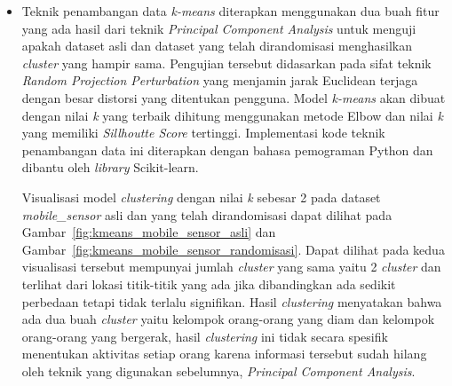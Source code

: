 \begin{itemize}
	\noindent\begin{minipage}{.44\textwidth}
	\begin{lstlisting}[caption=Sillhoutte Score Dataset Asli,frame=tlrb, label=mobile_sensor_siluet_asli]{Name}
Sillhoutte Score setiap K
pada dataset asli: 
2: 0.7568010158989575
3: 0.6390101777235029
4: 0.506497255331499
5: 0.4790910470659918
6: 0.4497981866661921
7: 0.4414685328088866
8: 0.4122363491089296
9: 0.39158160384319435
10: 0.3854996654126945
	\end{lstlisting}
	\end{minipage}\hfill
	\begin{minipage}{.44\textwidth}
	\begin{lstlisting}[caption=Sillhoutte Score Dataset Randomisasi,frame=tlrb, label=mobile_sensor_siluet_randomisasi]{Name}
Sillhoutte Score setiap K
pada dataset randomisasi: 
2: 0.7581796759180272
3: 0.6472419899391577
4: 0.5015650888399312
5: 0.47862510668209096
6: 0.45064475921629954
7: 0.43865532313764366
8: 0.4186927518384631
9: 0.3930205669353965
10: 0.3889412224520463
	\end{lstlisting}
	\end{minipage}
	\item Teknik penambangan data \textit{k-means} diterapkan menggunakan dua buah fitur yang ada hasil dari teknik \textit{Principal Component Analysis} untuk menguji apakah dataset asli dan dataset yang telah dirandomisasi menghasilkan \textit{cluster} yang hampir sama. Pengujian tersebut didasarkan pada sifat teknik \textit{Random Projection Perturbation} yang menjamin jarak Euclidean terjaga dengan besar distorsi yang ditentukan pengguna. Model \textit{k-means} akan dibuat dengan nilai \textit{k} yang terbaik dihitung menggunakan metode Elbow dan nilai \textit{k} yang memiliki \textit{Sillhoutte Score} tertinggi. Implementasi kode teknik penambangan data ini diterapkan dengan bahasa pemograman Python dan dibantu oleh \textit{library} Scikit-learn. 

	Visualisasi model \textit{clustering} dengan nilai \textit{k} sebesar 2 pada dataset \textit{mobile\_sensor} asli dan yang telah dirandomisasi dapat dilihat pada Gambar~\ref{fig:kmeans_mobile_sensor_asli} dan Gambar~\ref{fig:kmeans_mobile_sensor_randomisasi}. Dapat dilihat pada kedua visualisasi tersebut mempunyai jumlah \textit{cluster} yang sama yaitu 2 \textit{cluster} dan terlihat dari lokasi titik-titik yang ada jika dibandingkan ada sedikit perbedaan tetapi tidak terlalu signifikan. Hasil \textit{clustering} menyatakan bahwa ada dua buah \textit{cluster} yaitu kelompok orang-orang yang diam dan kelompok orang-orang yang bergerak, hasil \textit{clustering} ini tidak secara spesifik menentukan aktivitas setiap orang karena informasi tersebut sudah hilang oleh teknik yang digunakan sebelumnya, \textit{Principal Component Analysis}. 
	

\end{itemize}
